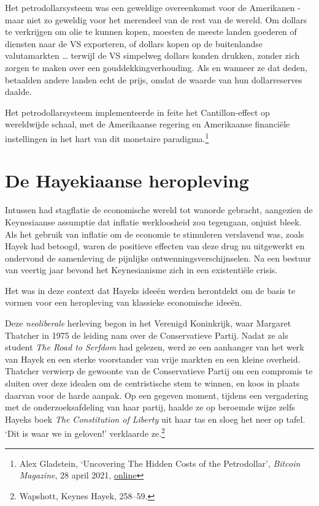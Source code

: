 \documentclass[
  a5paper,
  smalldemyvopaper,11pt,twoside,onecolumn,openright,extrafontsizes]{memoir}
\begin{document}
Het petrodollarsysteem was een geweldige overeenkomst voor de Amerikanen
- maar niet zo geweldig voor het merendeel van de rest van de wereld. Om
dollars te verkrijgen om olie te kunnen kopen, moesten de meeste landen
goederen of diensten naar de VS exporteren, of dollars kopen op de
buitenlandse valutamarkten \ldots{} terwijl de VS simpelweg dollars
konden drukken, zonder zich zorgen te maken over een
gouddekkingverhouding. Als en wanneer ze dat deden, betaalden andere
landen echt de prijs, omdat de waarde van hun dollarreserves daalde.

Het petrodollarsysteem implementeerde in feite het Cantillon-effect op
wereldwijde schaal, met de Amerikaanse regering en Amerikaanse
financiële instellingen in het hart van dit monetaire
paradigma.\footnote{Alex Gladstein, `Uncovering The Hidden Costs of the
  Petrodollar', \emph{Bitcoin Magazine}, 28 april 2021,
  \href{https://bitcoinmagazine.com/culture/the-hidden-costs-of-the-petrodollar}{online}}

\section{De Hayekiaanse heropleving}\label{de-hayekiaanse-heropleving}

Intussen had stagflatie de economische wereld tot wanorde gebracht,
aangezien de Keynesiaanse assumptie dat inflatie werkloosheid zou
tegengaan, onjuist bleek. Als het gebruik van inflatie om de economie te
stimuleren verslavend was, zoals Hayek had betoogd, waren de positieve
effecten van deze drug nu uitgewerkt en ondervond de samenleving de
pijnlijke ontwenningsverschijnselen. Na een bestuur van veertig jaar
bevond het Keynesianisme zich in een existentiële crisis.

Het was in deze context dat Hayeks ideeën werden herontdekt om de basis
te vormen voor een heropleving van klassieke economische ideeën.

Deze \emph{neoliberale} herleving begon in het Verenigd Koninkrijk, waar
Margaret Thatcher in 1975 de leiding nam over de Conservatieve Partij.
Nadat ze als student \emph{The Road to Serfdom} had gelezen, werd ze een
aanhanger van het werk van Hayek en een sterke voorstander van vrije
markten en een kleine overheid. Thatcher verwierp de gewoonte van de
Conservatieve Partij om een compromis te sluiten over deze idealen om de
centristische stem te winnen, en koos in plaats daarvan voor de harde
aanpak. Op een gegeven moment, tijdens een vergadering met de
onderzoeksafdeling van haar partij, haalde ze op beroemde wijze zelfs
Hayeks boek \emph{The Constitution of Liberty} uit haar tas en sloeg het
neer op tafel. `Dit is waar we in geloven!' verklaarde ze.\footnote{Wapshott,
  Keynes Hayek, 258--59.}
\end{document}
